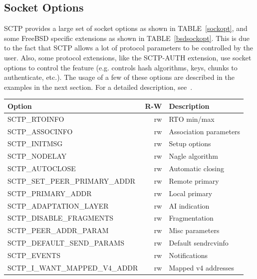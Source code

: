 \documentclass[conference]{IEEEtran}
\begin{document}
\subsection{Socket Options}

SCTP provides a large set of socket options as shown in TABLE~\ref{sockopt}, and some FreeBSD
specific extensions as shown in TABLE~\ref{bsdsockopt}.
This is due to the fact that SCTP allows a lot of protocol parameters to be controlled by the
user. Also, some protocol extensions, like the SCTP-AUTH \cite{rfc4895} extension, use socket options to
control the feature (e.g. controls hash algorithms, keys, chunks to authenticate, etc.). 
The usage of a few of these options are described in the examples in the
next section. For a detailed description, see~\cite{socketdraft}.

\begin{table}[h]
\begin{center}
\begin{tabular}{|l|r|l|}
\hline
Option                          & R-W & Description              \\\hline
\hline
SCTP\_RTOINFO                   & rw  & RTO min/max              \\\hline
SCTP\_ASSOCINFO                 & rw  & Association parameters   \\\hline
SCTP\_INITMSG                   & rw  & Setup options            \\\hline
SCTP\_NODELAY                   & rw  & Nagle algorithm          \\\hline
SCTP\_AUTOCLOSE                 & rw  & Automatic closing        \\\hline
SCTP\_SET\_PEER\_PRIMARY\_ADDR  & rw  & Remote primary           \\\hline
SCTP\_PRIMARY\_ADDR             & rw  & Local primary            \\\hline
SCTP\_ADAPTATION\_LAYER         & rw  & AI indication            \\\hline
SCTP\_DISABLE\_FRAGMENTS        & rw  & Fragmentation            \\\hline
SCTP\_PEER\_ADDR\_PARAM         & rw  & Misc parameters          \\\hline
SCTP\_DEFAULT\_SEND\_PARAMS     & rw  & Default sendrcvinfo      \\\hline
SCTP\_EVENTS                    & rw  & Notifications            \\\hline
SCTP\_I\_WANT\_MAPPED\_V4\_ADDR & rw  & Mapped v4 addresses      \\\hline

\end{tabular}
\end{center}
\end{table}
\end{document}
